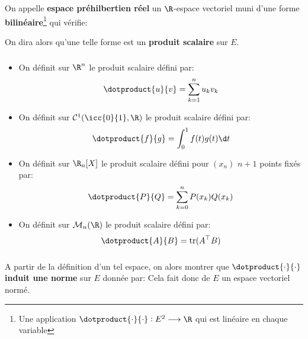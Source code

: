 \chapter*{}
On appelle \textbf{espace préhilbertien réel} un \(\R\)-espace vectoriel muni d'une forme \textbf{bilinéaire}\footnote[1]{Une application \(\dotproduct{\cdot}{\cdot} : E^2 \longrightarrow \R\) qui est linéaire en chaque variable} qui vérifie:

On dira alors qu'une telle forme est un \textbf{produit scalaire} sur \(E\).
\subsection*{}
\begin{itemize}
   \item On définit sur \(\R^n\) le produit scalaire défini par:
   \[
      \dotproduct{u}{v} = \sum_{k=1}^{n} u_kv_k    
   \]
   \item On définit sur \(\mathcal{C}^1(\icc{0}{1}, \R)\) le produit scalaire défini par:
   \[
      \dotproduct{f}{g} = \int_{0}^{1} f(t)g(t) \d t    
   \]
   \item On définit sur \(\R_n[X]\) le produit scalaire défini pour \((x_n)\) \(n + 1\) points fixés par:
   \[
      \dotproduct{P}{Q} = \sum_{k=0}^{n}P(x_k)Q(x_k)
   \]   
   \item On définit sur \(\mathcal{M}_n(\R)\) le produit scalaire défini par:
   \[
      \dotproduct{A}{B} = \text{tr}(A^\top B)
   \]
\end{itemize}

\subsection*{}
A partir de la définition d'un tel espace, on alors montrer que \(\dotproduct{\cdot}{\cdot}\) \textbf{induit une norme} sur \(E\) donnée par:
Cela fait donc de \(E\) un espace vectoriel normé.

